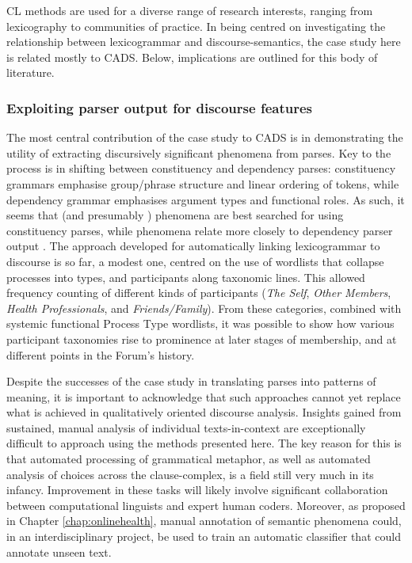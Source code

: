 \gls{CL} methods are used for a diverse range of research interests, ranging from lexicography to communities of practice. In being centred on investigating the relationship between \gls{lexicogrammar} and \glspl{discourse-semantic}, the case study here is related mostly to \gls{CADS}. Below, implications are outlined for this body of literature.

\subsubsection{Exploiting parser output for discourse features}

The most central contribution of the case study to \gls{CADS} is in demonstrating the utility of extracting discursively significant phenomena from  parses. Key to the process is in shifting between constituency and dependency parses: constituency grammars emphasise group\slash phrase structure and linear ordering of tokens, while dependency grammar emphasises argument types and functional roles. As such, it seems that  (and presumably ) phenomena are best searched for using constituency parses, while  phenomena relate more closely to dependency parser output \cite{costetchi_method_2013}. The approach developed for automatically linking \gls{lexicogrammar} to discourse is so far, a modest one, centred on the use of wordlists that collapse processes into types, and participants along taxonomic lines. This allowed frequency counting of different kinds of participants (\emph{The Self}, \emph{Other Members}, \emph{Health Professionals}, and \emph{Friends\slash Family}). From these categories, combined with systemic functional Process Type wordlists, it was possible to show how various participant taxonomies \cite[see][]{martin_english_1992} rise to prominence at later stages of membership, and at different points in the \gls{Forum}'s history.

Despite the successes of the case study in translating  parses into patterns of meaning, it is important to acknowledge that such approaches cannot yet replace what is achieved in qualitatively oriented discourse analysis. Insights gained from sustained, manual analysis of individual texts\hyp{}in\hyp{}context are exceptionally difficult to approach using the methods presented here. The key reason for this is that automated processing of grammatical metaphor, as well as automated analysis of  choices across the clause\hyp{}complex, is a field still very much in its infancy. Improvement in these tasks will likely involve significant collaboration between computational linguists and expert human coders. Moreover, as proposed in Chapter \ref{chap:onlinehealth}, manual annotation of semantic phenomena could, in an interdisciplinary project, be used to train an automatic classifier that could annotate unseen text.

